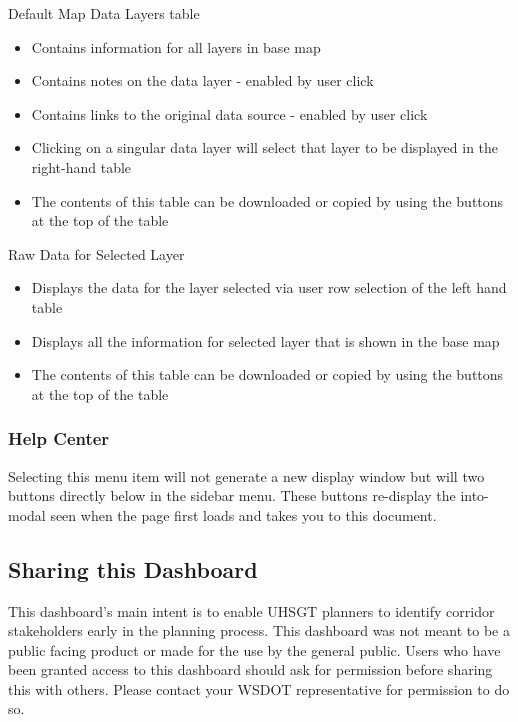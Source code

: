 \documentclass[
]{article}
\providecommand{\tightlist}{%
  \setlength{\itemsep}{0pt}\setlength{\parskip}{0pt}}
\begin{document}
Default Map Data Layers table

\begin{itemize}
\tightlist
\item
  Contains information for all layers in base map
\item
  Contains notes on the data layer - enabled by user click
\item
  Contains links to the original data source - enabled by user click
\item
  Clicking on a singular data layer will select that layer to be
  displayed in the right-hand table
\item
  The contents of this table can be downloaded or copied by using the
  buttons at the top of the table
\end{itemize}

Raw Data for Selected Layer

\begin{itemize}
\tightlist
\item
  Displays the data for the layer selected via user row selection of the
  left hand table
\item
  Displays all the information for selected layer that is shown in the
  base map
\item
  The contents of this table can be downloaded or copied by using the
  buttons at the top of the table
\end{itemize}

\hypertarget{help-center}{%
\subsubsection{Help Center}\label{help-center}}

Selecting this menu item will not generate a new display window but will
two buttons directly below in the sidebar menu. These buttons re-display
the into-modal seen when the page first loads and takes you to this
document.

\hypertarget{sharing-this-dashboard}{%
\subsection{Sharing this Dashboard}\label{sharing-this-dashboard}}

This dashboard's main intent is to enable UHSGT planners to identify
corridor stakeholders early in the planning process. This dashboard was
not meant to be a public facing product or made for the use by the
general public. Users who have been granted access to this dashboard
should ask for permission before sharing this with others. Please
contact your WSDOT representative for permission to do so.
\end{document}
